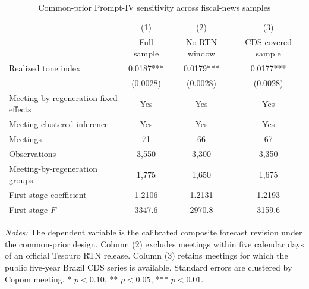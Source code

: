 \begin{table}[htbp]
\color{revisionred}
\centering
\begin{threeparttable}
\caption{Common-prior Prompt-IV sensitivity across fiscal-news samples}
\label{tab:fiscal-iv}
\begin{footnotesize}
\begin{tabular}{lccc}
\toprule
 & (1) & (2) & (3) \\
 & Full sample & No RTN window & CDS-covered sample \\
\midrule
Realized tone index & 0.0187*** & 0.0179*** & 0.0177*** \\
 & (0.0028) & (0.0028) & (0.0028) \\
\midrule
Meeting-by-regeneration fixed effects & Yes & Yes & Yes \\
Meeting-clustered inference & Yes & Yes & Yes \\
Meetings & 71 & 66 & 67 \\
Observations & 3,550 & 3,300 & 3,350 \\
Meeting-by-regeneration groups & 1,775 & 1,650 & 1,675 \\
First-stage coefficient & 1.2106 & 1.2131 & 1.2193 \\
First-stage $F$ & 3347.6 & 2970.8 & 3159.6 \\
\bottomrule
\end{tabular}
\begin{tablenotes}[flushleft]
\scriptsize
\item \textit{Notes:} The dependent variable is the calibrated composite forecast revision under the common-prior design. Column (2) excludes meetings within five calendar days of an official Tesouro RTN release. Column (3) retains meetings for which the public five-year Brazil CDS series is available. Standard errors are clustered by Copom meeting. * $p<0.10$, ** $p<0.05$, *** $p<0.01$.
\end{tablenotes}
\end{footnotesize}
\end{threeparttable}
\end{table}
